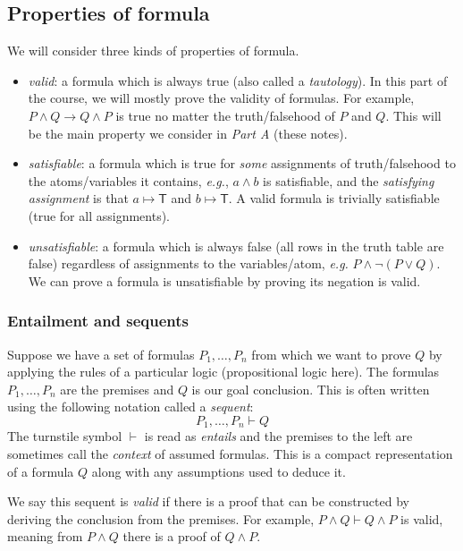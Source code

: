 \documentclass{article}
\theoremstyle{definition}
\newcommand{\eg}{\emph{e.g.}}
\begin{document}
\subsection{Properties of formula}

We will consider three kinds of properties of formula.

\begin{itemize}[leftmargin=1.5em]
  \item \emph{valid}: a formula which is always true (also
  called a \emph{tautology}). In this part of the course, we will
  mostly prove the validity of formulas. For example, $P \wedge Q
  \rightarrow Q \wedge P$ is true no matter the
  truth/falsehood of $P$ and $Q$. This will be the main property we
  consider in \emph{Part A} (these notes).
%
  \item \emph{satisfiable}: a formula which is true for
  \emph{some} assignments of truth/falsehood to the atoms/variables it contains, \eg{},
  $a \wedge b$ is satisfiable, and the \emph{satisfying assignment} is that
  $a \mapsto \mathsf{T}$ and $b \mapsto \mathsf{T}$. A valid formula
  is trivially satisfiable (true for all assignments).
%
  \item \emph{unsatisfiable}: a formula which is always false (all
  rows in the truth table are false) regardless of assignments to the
  variables/atom, \eg{} $P \wedge \neg (P \vee Q)$. We can
  prove a formula is unsatisfiable by proving its negation is valid.
\end{itemize}

\subsubsection{Entailment and sequents}
\label{sec:entailment}

Suppose we have a set of formulas $P_1, \ldots, P_n$ from which we
want to prove $Q$ by applying the rules of a particular logic
(propositional logic here). The formulas $P_1, \ldots, P_n$ are the
premises and $Q$ is our goal conclusion. This is often written using the
following notation called a \emph{sequent}:
%
\begin{equation*}
P_1, \ldots, P_n \vdash Q
\end{equation*}
%
The turnstile symbol $\vdash$ is read as \emph{entails} and the
premises to the left are sometimes call the \emph{context} of assumed
formulas. This is a compact representation of a formula $Q$ along with
any assumptions used to deduce it.

We say this sequent is \emph{valid} if there is a proof that can be
constructed by deriving the conclusion from the premises. For example,
$P \wedge Q \vdash Q \wedge P$ is valid, meaning from $P \wedge Q$
there is a proof of $Q \wedge P$.
\end{document}
